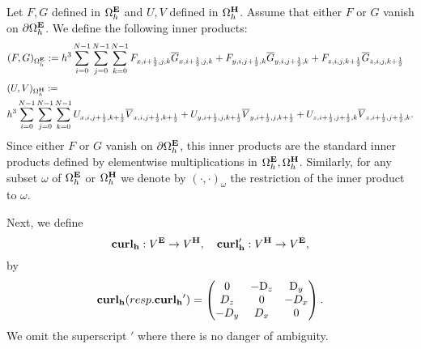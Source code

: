 \documentclass[12pt,reqno]{amsart}
\newcommand{\D}{{\rm D}}
\newcommand{\curl}{{\bf curl}}
\newcommand{\e}{{\bf E}}
\newcommand{\h}{{\bf H}}
\theoremstyle{definition}
\numberwithin{equation}{section}
\def\Gwh{\Omega_h}
\begin{document}
		Let $F,G$ defined in $\Gwh^{\bf{E}}$ and $U,V$ defined in 
		$\Gwh^{\bf{H}}$. Assume that either $F$ or $G$ vanish on $\partial \Gwh^\e$.
		We define the following inner products:
		\begin{align*}
&
		(F,G)_{\Gwh^\e}:=
		h^3\sum_{i=0}^{N-1}\sum_{j=0}^{N-1}\sum_{k=0}^{N-1}
		F_{x,i+\frac{1}{2},j,k}\overline{G}_{x,i+\frac{1}{2},j,k}+
		F_{y,i,j+\frac{1}{2},k}\overline{G}_{y,i,j+\frac{1}{2},k}+F_{z,i,j,k+\frac{1}{2}}\overline{G}_{z,i,j,k+\frac{1}{2}}
	\end{align*}
		\begin{align*}
			&
			(U,V)_{\Gwh^\h}:=\\&
			h^3\sum_{i=0}^{N-1}\sum_{j=0}^{N-1}\sum_{k=0}^{N-1}
			U_{x,i,j+\frac{1}{2},k+\frac{1}{2}}\overline{V}_{x,i,j+\frac{1}{2},k+\frac{1}{2}}+
			U_{y,i+\frac{1}{2},j,k+\frac{1}{2}}\overline{V}_{y,i+\frac{1}{2},j,k+\frac{1}{2}}+U_{z,i+\frac{1}{2},j+\frac{1}{2},k}\overline{V}_{z,i+\frac{1}{2},j+\frac{1}{2},k}.
		\end{align*}
		Since either $F$ or $G$ vanish on $\partial \Gwh^\e$, this inner products are the standard inner products defined by elementwise  multiplications in $\Gwh^\e, \Gwh^\h$.
		Similarly, for any subset $\omega$ of $\Gwh^\e$ or $\Gwh^\h$ we denote by $(\cdot,\cdot)_{\omega}$ the restriction of the  inner product to $\omega$.
		
		
		
		Next, we define 
		$$
		\mathbf{\curl_h}:V^{\bf{E}}\to V^{\bf{H}}, \quad 
		\mathbf{\curl_h'}:V^{\bf{H}}\to V^{\bf{E}},
		$$
		by
		$$
		\mathbf{\curl_h}( resp. \mathbf{\curl_h}')=
		\begin{pmatrix}
			0& -\D_z & \D _y\\
			D_z&0&-D_x\\
			-D_y&D_x&0\\
		\end{pmatrix}.
		$$
		We omit the superscript $'$ where there is no danger of ambiguity.
		
\end{document}
